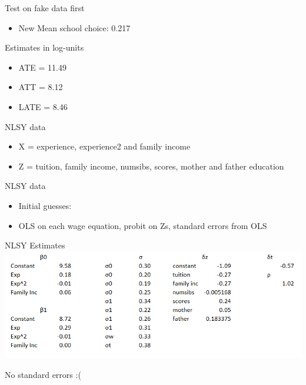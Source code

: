 \documentclass{beamer}
\begin{document}
\begin{frame}{Test on fake data first}
\begin{itemize}
\item New Mean school choice: 0.217
\end{itemize}
\end{frame}

\begin{frame}{Estimates in log-units}
\begin{itemize}
\item ATE = 11.49
\item ATT = 8.12
\item LATE = 8.46
\end{itemize}
\end{frame}


\begin{frame}{NLSY data}
\begin{itemize}
\item X = experience, experience2 and family income
\item Z = tuition, family income, numsibs, scores, mother and father education
\end{itemize}
\end{frame}

\begin{frame}{NLSY data}
\begin{itemize}
\item Initial guesses:
\item OLS on each wage equation, probit on Zs, standard errors from OLS
\end{itemize}
\end{frame}


\begin{frame}{NLSY Estimates}
\centering
\includegraphics[scale=0.59]{nlsy_est.png}

No standard errors :(
\end{frame}
\end{document}
